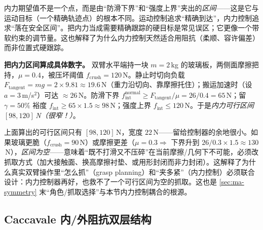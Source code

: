 \begin{insight}[内力期望值是一个区间而非一个点]
内力期望值不是一个点，而是由“防滑下界”和“强度上界”夹出的\emph{区间}——这是它与运动目标（一个精确轨迹点）的根本不同。运动控制追求“精确到达”，内力控制追求“落在安全区间”。把内力当成需要精确跟踪的硬目标是常见误区；它更像一个带软约束的调节量。这也解释了为什么内力控制天然适合用阻抗（柔顺、容许偏差）而非位置式硬跟踪。
\end{insight}

\textbf{把内力区间算成具体数字。} 双臂水平端持一块 $m=2$\,kg 的玻璃板，两侧面摩擦把持，$\mu=0.4$，被压坏阈值 $f_{\text{crush}}=120$\,N。静止时切向负载 $F_{\text{tangent}}=mg=2\times9.81\approx19.6$\,N（重力沿切向、靠摩擦托住）；搬运加速时（设 $a=3$\,m/s$^2$）可达 $\approx26$\,N。防滑下界 $f_{\text{int}}^{\text{normal}}\ge F_{\text{tangent}}/\mu=26/0.4=65$\,N；留 $\gamma=50\%$ 裕度 $f_{\text{int}}\ge65\times1.5\approx98$\,N；强度上界 $f_{\text{int}}\le120$\,N。于是\emph{内力可行区间 $[98,120]$\,N（很窄！）}。

\begin{insight}[区间可能很窄甚至为空]
上面算出的可行区间只有 $[98,120]$\,N，宽度 $22$\,N——留给控制器的余地很小。如果玻璃更脆（$f_{\text{crush}}=90$\,N）或摩擦更差（$\mu=0.3\Rightarrow$ 下界升到 $26/0.3\times1.5\approx130$\,N），\emph{区间为空}——意味着“既不打滑又不压碎”在当前摩擦/几何下不可能，必须改抓取方式（加大接触面、换高摩擦衬垫、或用形封闭而非力封闭）。这解释了为什么真实双臂操作里“怎么抓”（grasp planning）和“夹多紧”（内力控制）必须联合设计：内力控制器再好，也救不了一个可行区间为空的抓取。这也是 \cref{sec:ma-symmetry} 末“角色/抓取选择”与本节内力控制耦合的根源。
\end{insight}

\subsection{Caccavale 内/外阻抗双层结构}
\label{sec:ma-caccavale}


